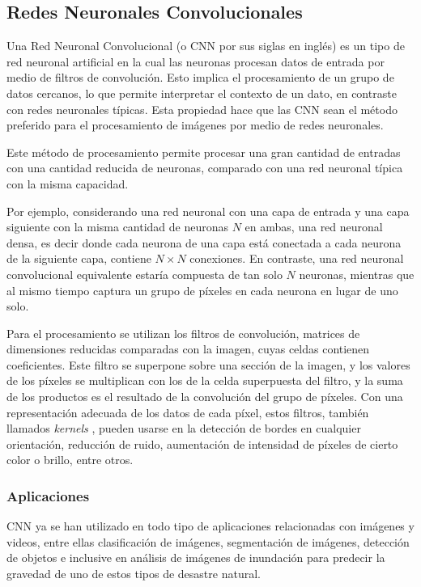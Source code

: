 \subsection{Redes Neuronales Convolucionales}

Una Red Neuronal Convolucional (o CNN por sus siglas en inglés) es un tipo de red neuronal artificial en la cual las
neuronas procesan datos de entrada por medio de filtros de convolución. Esto implica el procesamiento de un grupo de
datos cercanos, lo que permite interpretar el contexto de un dato, en contraste con redes neuronales típicas. Esta
propiedad hace que las CNN sean el método preferido para el procesamiento de imágenes por medio de redes neuronales.
\autocite{hands-on-machine-learning} \autocite{ciresan-cnn}

Este método de procesamiento permite procesar una gran cantidad de entradas con una cantidad reducida de neuronas,
comparado con una red neuronal típica con la misma capacidad.

Por ejemplo, considerando una red neuronal con una capa de entrada y una capa siguiente con la misma cantidad de
neuronas $N$ en ambas, una red neuronal densa, es decir donde cada neurona de una capa está conectada a cada neurona de
la siguiente capa, contiene $N \times N$ conexiones. En contraste, una red neuronal convolucional equivalente estaría
compuesta de tan solo $N$ neuronas, mientras que al mismo tiempo captura un grupo de píxeles en cada neurona en lugar
de uno solo.

Para el procesamiento se utilizan los filtros de convolución, matrices de dimensiones reducidas comparadas con la
imagen, cuyas celdas contienen coeficientes. Este filtro se superpone sobre una sección de la imagen, y los valores de
los píxeles se multiplican con los de la celda superpuesta del filtro, y la suma de los productos es el resultado de la
convolución del grupo de píxeles. Con una representación adecuada de los datos de cada píxel, estos filtros, también
llamados {\it kernels }, pueden usarse en la detección de bordes en cualquier orientación, reducción de ruido,
aumentación de intensidad de píxeles de cierto color o brillo, entre otros. \autocite{ciresan-cnn}

\subsubsection{Aplicaciones}

CNN ya se han utilizado en todo tipo de aplicaciones relacionadas con imágenes y videos, entre ellas clasificación de
imágenes, segmentación de imágenes, detección de objetos e inclusive en análisis de imágenes de inundación para
predecir la gravedad de uno de estos tipos de desastre natural. \autocite{pally2022105285}

